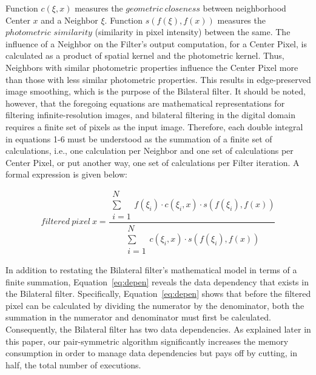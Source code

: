 \documentclass{IEEEtran}
\begin{document}
Function $c(\xi,x)$ measures the $geometric~closeness$ between neighborhood Center $x$ and a Neighbor $\xi$. Function $s(f(\xi),f(x))$ measures the $photometric$ $similarity$ (similarity in pixel intensity) between the same. The influence of a Neighbor on the Filter's output computation, for a Center Pixel, is calculated as a product of spatial kernel and the photometric kernel. Thus, Neighbors with similar photometric properties influence the Center Pixel more than those with less similar photometric properties. This results in edge-preserved image smoothing, which is the purpose of the Bilateral filter. It should be noted, however, that the foregoing equations are mathematical representations for filtering infinite-resolution images, and bilateral filtering in the digital domain requires a finite set of pixels as the input image. Therefore, each double integral in equations 1-6 must be understood as the summation of a finite set of calculations, i.e., one calculation per Neighbor and one set of calculations per Center Pixel, or put another way, one set of calculations per Filter iteration. A formal expression is given below:

\begin{equation}
\label{eq:depen}
filtered\: pixel\: x=\frac{\substack{N\\
\sum\\
i=1
}
f(\xi_{i})\cdot c(\xi_{i},x)\cdot s(f(\xi_{i}),f(x))}{\substack{N\\
\sum\\
i=1
}
c(\xi_{i},x)\cdot s(f(\xi_{i}),f(x))}
\end{equation}

In addition to restating the Bilateral filter's mathematical model in terms of a finite summation, Equation~\ref{eq:depen} reveals the data dependency that exists in the Bilateral filter. Specifically, Equation~\ref{eq:depen} shows that before the filtered pixel can be calculated by dividing the numerator by the denominator, both the summation in the numerator and denominator must first be calculated. Consequently, the Bilateral filter has two data dependencies. As explained later in this paper, our pair-symmetric algorithm significantly increases the memory consumption in order to manage data dependencies but pays off by cutting, in half, the total number of executions.
\end{document}

